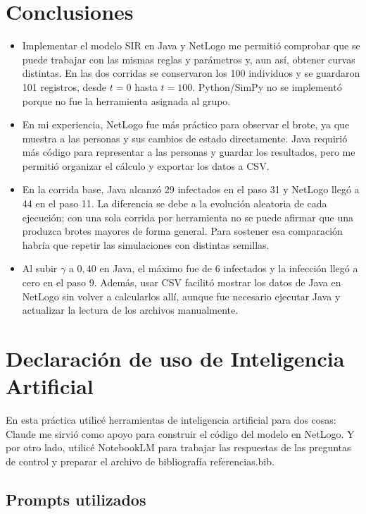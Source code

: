 \documentclass[11pt,a4paper]{article}
\begin{document}
\section{Conclusiones}
\begin{itemize}
  \item Implementar el modelo SIR en Java y NetLogo me permitió comprobar que se puede trabajar con las mismas reglas y parámetros y, aun así, obtener curvas distintas. En las dos corridas se conservaron los 100 individuos y se guardaron 101 registros, desde $t=0$ hasta $t=100$. Python/SimPy no se implementó porque no fue la herramienta asignada al grupo.
  \item En mi experiencia, NetLogo fue más práctico para observar el brote, ya que muestra a las personas y sus cambios de estado directamente. Java requirió más código para representar a las personas y guardar los resultados, pero me permitió organizar el cálculo y exportar los datos a CSV.
  \item En la corrida base, Java alcanzó 29 infectados en el paso 31 y NetLogo llegó a 44 en el paso 11. La diferencia se debe a la evolución aleatoria de cada ejecución; con una sola corrida por herramienta no se puede afirmar que una produzca brotes mayores de forma general. Para sostener esa comparación habría que repetir las simulaciones con distintas semillas.
  \item Al subir $\gamma$ a $0{,}40$ en Java, el máximo fue de 6 infectados y la infección llegó a cero en el paso 9. Además, usar CSV facilitó mostrar los datos de Java en NetLogo sin volver a calcularlos allí, aunque fue necesario ejecutar Java y actualizar la lectura de los archivos manualmente.
\end{itemize}

\section{Declaración de uso de Inteligencia Artificial}
En esta práctica utilicé herramientas de inteligencia artificial para dos cosas: Claude me sirvió como apoyo para construir el código del modelo en NetLogo. Y por otro lado, utilicé NotebookLM para trabajar las respuestas de las preguntas de control y preparar el archivo de bibliografía referencias.bib. 
\subsection{Prompts utilizados}
\end{document}

